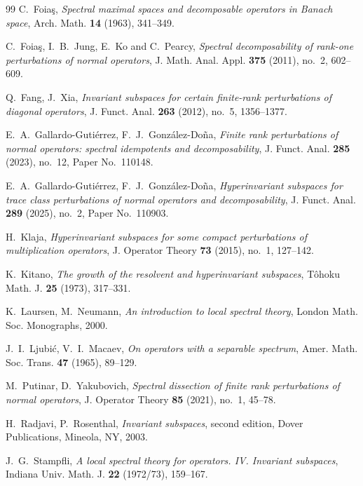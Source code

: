 \documentclass[11pt]{amsart}
\theoremstyle{definition}
\theoremstyle{remark}
\numberwithin{equation}{section}
\begin{document}
\begin{thebibliography}{99}
C.~Foia\c{s}, \textit{Spectral maximal spaces and decomposable operators in Banach space}, Arch. Math. \textbf{14} (1963), 341--349.

C.~Foia\c{s}, I.~B.~Jung, E.~Ko and C.~Pearcy, \textit{Spectral decomposability of rank-one perturbations of normal operators}, J. Math. Anal. Appl. \textbf{375} (2011), no.~2, 602--609.

Q.~Fang, J.~Xia, \textit{Invariant subspaces for certain finite-rank perturbations of diagonal operators}, J. Funct. Anal. \textbf{263} (2012), no.~5, 1356--1377.

E.~A.~Gallardo-Gutiérrez, F.~J.~González-Doña, \textit{Finite rank perturbations of normal operators: spectral idempotents and decomposability}, J. Funct. Anal. \textbf{285} (2023), no.~12, Paper No.~110148.

E.~A.~Gallardo-Gutiérrez, F.~J.~González-Doña, \textit{Hyperinvariant subspaces for trace class perturbations of normal operators and decomposability}, J. Funct. Anal. \textbf{289} (2025), no.~2, Paper No.~110903.

H.~Klaja, \textit{Hyperinvariant subspaces for some compact perturbations of multiplication operators}, J. Operator Theory \textbf{73} (2015), no.~1, 127--142.

K.~Kitano, \textit{The growth of the resolvent and hyperinvariant subspaces}, T\^ohoku Math. J. \textbf{25} (1973), 317--331.

K.~Laursen, M.~Neumann, \textit{An introduction to local spectral theory}, London Math. Soc. Monographs, 2000.

J.~I.~Ljubi\'c, V.~I.~Macaev, \textit{On operators with a separable spectrum}, Amer. Math. Soc. Trans. \textbf{47} (1965), 89--129.

M.~Putinar, D.~Yakubovich, \textit{Spectral dissection of finite rank perturbations of normal operators}, J. Operator Theory \textbf{85} (2021), no.~1, 45--78.

H.~Radjavi, P.~Rosenthal, \textit{Invariant subspaces}, second edition, Dover Publications, Mineola, NY, 2003.

J.~G.~Stampfli, \textit{A local spectral theory for operators. IV. Invariant subspaces}, Indiana Univ. Math. J. \textbf{22} (1972/73), 159--167.
\end{thebibliography}
\end{document}
